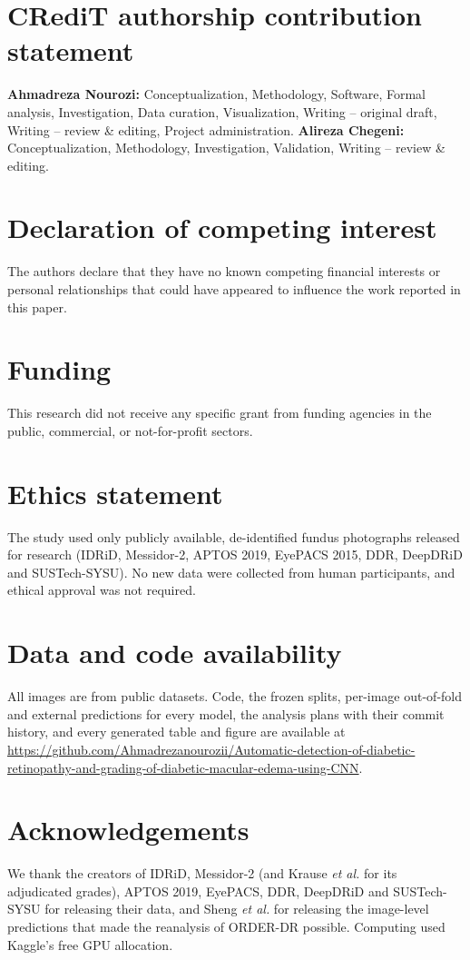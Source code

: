 \section*{CRediT authorship contribution statement}
\textbf{Ahmadreza Nourozi:} Conceptualization, Methodology, Software, Formal analysis,
Investigation, Data curation, Visualization, Writing -- original draft, Writing -- review \&
editing, Project administration. \textbf{Alireza Chegeni:} Conceptualization, Methodology,
Investigation, Validation, Writing -- review \& editing.

\section*{Declaration of competing interest}
The authors declare that they have no known competing financial interests or personal
relationships that could have appeared to influence the work reported in this paper.

\section*{Funding}
This research did not receive any specific grant from funding agencies in the public, commercial,
or not-for-profit sectors.

\section*{Ethics statement}
The study used only publicly available, de-identified fundus photographs released for research
(IDRiD, Messidor-2, APTOS 2019, EyePACS 2015, DDR, DeepDRiD and SUSTech-SYSU). No new data were
collected from human participants, and ethical approval was not required.

\section*{Data and code availability}
All images are from public datasets. Code, the frozen splits, per-image out-of-fold and external
predictions for every model, the analysis plans with their commit history, and every generated
table and figure are available at
\url{https://github.com/Ahmadrezanourozii/Automatic-detection-of-diabetic-retinopathy-and-grading-of-diabetic-macular-edema-using-CNN}.

\section*{Acknowledgements}
We thank the creators of IDRiD, Messidor-2 (and Krause \emph{et al.} for its adjudicated grades),
APTOS 2019, EyePACS, DDR, DeepDRiD and SUSTech-SYSU for releasing their data, and Sheng \emph{et
al.} for releasing the image-level predictions that made the reanalysis of ORDER-DR possible.
Computing used Kaggle's free GPU allocation.

